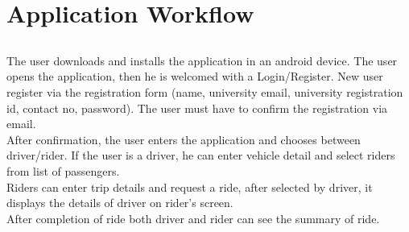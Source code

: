 \chapter{Application Workflow} \label{ap:Appendix1}

\section*{}
The user downloads and installs the application in an android device. The user opens the application, then he is welcomed with a Login/Register. New user register via the registration form (name, university email, university registration id, contact no, password). The user must have to confirm the registration via email.\\

After confirmation, the user enters the application and chooses between driver/rider. If the user is a driver, he can enter vehicle detail and select riders from list of passengers.\\

Riders can enter trip details and request a ride, after selected by driver, it displays the details of driver on rider's screen.\\

After completion of ride both driver and rider can see the summary of ride.


